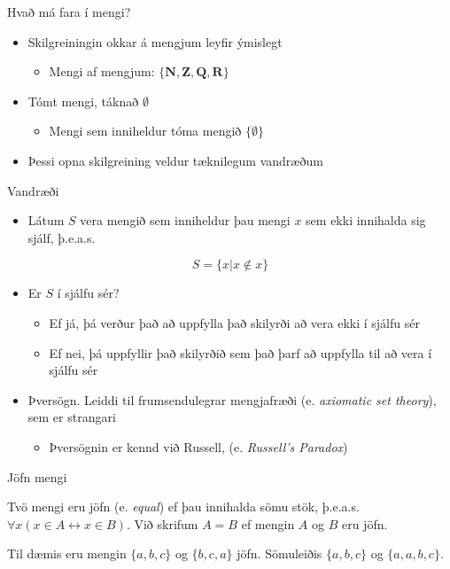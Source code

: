\documentclass{beamer}
\begin{document}
\begin{frame}{Hvað má fara í mengi?}
\begin{itemize}
 \item Skilgreiningin okkar á mengjum leyfir ýmislegt
 \begin{itemize}
  \item Mengi af mengjum: $\{\mathbf{N}, \mathbf{Z}, \mathbf{Q}, \mathbf{R}\}$
 \end{itemize}
 \item Tómt mengi, táknað $\emptyset$
 \begin{itemize}
  \item Mengi sem inniheldur tóma mengið $\{\emptyset\}$
 \end{itemize}
 \item Þessi opna skilgreining veldur tæknilegum vandræðum
\end{itemize}
\end{frame}

\begin{frame}{Vandræði}
\begin{itemize}
 \item Látum $S$ vera mengið sem inniheldur þau mengi $x$ sem ekki innihalda sig sjálf, þ.e.a.s.
\end{itemize}
\[
 S = \{x | x \notin x\}
\]
\begin{itemize}
 \item Er $S$ í sjálfu sér? \pause
 \begin{itemize}
  \item Ef já, þá verður það að uppfylla það skilyrði að vera ekki í sjálfu sér \pause
  \item Ef nei, þá uppfyllir það skilyrðið sem það þarf að uppfylla til að vera í sjálfu sér \pause
 \end{itemize}
 \item Þversögn. Leiddi til frumsendulegrar mengjafræði (e. \emph{axiomatic set theory}), sem er strangari
 \begin{itemize}
  \item Þversögnin er kennd við Russell, (e. \emph{Russell's Paradox})
 \end{itemize}

\end{itemize}
\end{frame}

\begin{frame}{Jöfn mengi}
\begin{tcolorbox}[title=Jöfn mengi]
Tvö mengi eru jöfn (e. \emph{equal}) ef þau innihalda sömu stök, þ.e.a.s. $\forall x (x \in A \leftrightarrow x \in B ) $. Við skrifum $A = B$ ef mengin $A$ og $B$ eru jöfn.
\end{tcolorbox}
Til dæmis eru mengin $\{a, b, c\}$ og $\{b, c, a\}$ jöfn. Sömuleiðis $\{a, b, c\}$ og $\{a, a, b, c\}$.
\end{frame}
\end{document}
